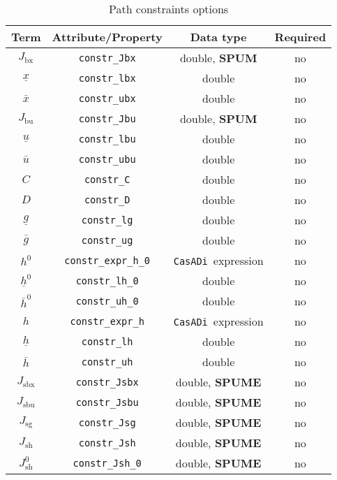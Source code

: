 \documentclass[english]{article}
\newcommand{\code}[1]{\texttt{#1}}
\newcommand{\casadi}{\texttt{CasADi}}
\newcommand{\ind}[1]{_{\textrm{#1}}}
\newcommand{\initial}{^{\textrm{0}}}
\newcommand{\optional}{no}
\begin{document}
\begin{table}[ht!]
    \centering
    \caption{Path constraints options} \label{tab:constraints:path}
    \begin{tabular}{cccc}
        \toprule
        Term & Attribute/Property & Data type & Required \\ \midrule
        $J\ind{bx}$ & \code{constr\_Jbx}    & double, \textbf{SPUM} & \optional  \\
        $\underline{x} $    & \code{constr\_lbx}     & double  & \optional  \\
        $\bar{x} $  & \code{constr\_ubx}     & double  & \optional   \\ [1em]
        $J\ind{bu}$ & \code{constr\_Jbu}    & double, \textbf{SPUM}   & \optional    \\
        $\underline{u} $    & \code{constr\_lbu}     & double   & \optional   \\
        $\bar{u} $         & \code{constr\_ubu}     & double  & \optional   \\ [1em]
        $C$ & \code{constr\_C}    & double  & \optional \\
        $D $    & \code{constr\_D}     & double  & \optional \\
        $\underline{g} $    & \code{constr\_lg}     & double  & \optional    \\
        $\bar{g} $         & \code{constr\_ug}     & double  & \optional   \\ [1em]
        $ h\initial $ & \code{constr\_expr\_h\_0}    & \casadi~expression  & \optional   \\
        $\underline{h}\initial $    & \code{constr\_lh\_0}     & double   & \optional   \\
        $\bar{h}\initial $         & \code{constr\_uh\_0}     & double  & \optional   \\ [1em]
        $ h $ & \code{constr\_expr\_h}    & \casadi~expression  & \optional   \\
        $\underline{h} $    & \code{constr\_lh}     & double   & \optional   \\
        $\bar{h} $         & \code{constr\_uh}     & double  & \optional   \\ [1em]
        $ J\ind{sbx} $ & \code{constr\_Jsbx} & double, \textbf{SPUME} & \optional  \\
        $ J\ind{sbu} $ & \code{constr\_Jsbu} & double, \textbf{SPUME}  & \optional \\
        $ J\ind{sg} $ & \code{constr\_Jsg} & double, \textbf{SPUME} & \optional  \\
        $ J\ind{sh} $ & \code{constr\_Jsh} & double, \textbf{SPUME}  & \optional  \\
        $ J\ind{sh}\initial $ & \code{constr\_Jsh\_0} & double, \textbf{SPUME}  & \optional  \\
        \bottomrule
    \end{tabular}
\end{table}
%
\end{document}
